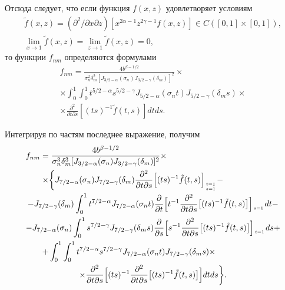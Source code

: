 	Отсюда следует, что если функция $f(x,z)$ удовлетворяет условиям
\begin{equation}
 \begin{array}{c}
\tilde f(x,z)=\left(\partial^2/\partial x\partial z\right)[x^{2\alpha-1}z^{2\gamma-1}f(x,z)]\in C([0,1]\times[0,1]), 
\\
\lim\limits_{x\to1}\tilde f(x,z)=\lim\limits_{z\to1}\tilde f(x,z)=0,
 \end{array}
\label{eq:k43}
\end{equation}
то функции $f_{nm} $ определяются формулами
\begin{multline*}
f_{nm}=\frac{4b^{\beta- 1/2 }}{\sigma_n^2\delta_m^2[J_{3/2-\alpha}(\sigma_n)J_{3/2-\gamma}(\delta_m)]^2}\times
\\
\times\int_0^1 \int_0^1 
t^{5/2-\alpha}s^{5/2-\gamma}J_{5/2-\alpha}(\sigma_n t)J_{5/2-\gamma}(\delta_m s)
\times 
\\
\times
\frac{\partial^2}{\partial t\partial s}[(ts)^{-1}\tilde f(t,s)]dtds.
\end{multline*}

Интегрируя по частям последнее выражение, получим
\begin{multline*}
f_{nm}=\frac{4b^{\beta- 1/2 }}{\sigma_n^3\delta_m^3[J_{3/2-\alpha}(\sigma_n)J_{3/2-\gamma}(\delta_m)]^2}\times 
\hfill
\\
~~~~~~
\times
\biggl\{
J_{7/2-\alpha}(\sigma_n)J_{7/2-\gamma}(\delta_m)\frac{\partial^2}{\partial t\partial s}
\Bigl
[(ts)^{-1}\tilde f(t,s) \Bigr]_{t=1 \atop s=1}- 
\hfill
\\
-J_{7/2-\gamma}(\delta_m)\int_0^1{t^{7/2-\alpha}J_{7/2-\alpha}(\sigma_n t)\frac{\partial}{\partial t}
\Bigl[t^{-1}\frac{\partial^2}{\partial t\partial s}\bigl[(ts)^{-1}\tilde f(t,s)\bigr]\Bigr]_{s=1 \atop{}}dt}-
\\
-J_{7/2-\alpha}(\sigma_n)\int_0^1 s^{7/2-\gamma}J_{7/2-\gamma}(\delta_m s)\frac{\partial}{\partial s}
\Bigl[
s^{-1}\frac{\partial^2}{\partial t\partial s}\bigl[(ts)^{-1}\tilde f(t,s)\bigr]\Bigr]_{t=1 \atop{}}ds+
\\
~~~~~~
+\int_0^1 
\int_0^1 t^{7/2-\alpha}s^{7/2-\gamma}J_{7/2-\alpha}(\sigma_n t)J_{7/2-\gamma}(\delta_m s)
\times \hfill
\\
\times \frac{\partial^2}{\partial t\partial s}
\Bigl[(ts)^{-1}\frac{\partial^2}{\partial t\partial s}\bigl[(ts)^{-1}\tilde f(t,s)\bigr]\Bigr]dtds
\biggr\}.
\end{multline*}





